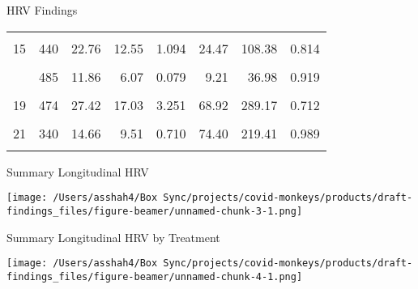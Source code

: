 \documentclass[
  ignorenonframetext,
  unknownkeysallowed]{beamer}
\begin{document}
\begin{frame}{HRV Findings}
\begin{table}[H]
\begin{tabular}{rrrrrrrr}
\cellcolor{gray!6}{14} & \cellcolor{gray!6}{339} & \cellcolor{gray!6}{9.61} & \cellcolor{gray!6}{8.77} & \cellcolor{gray!6}{0.477} & \cellcolor{gray!6}{20.89} & \cellcolor{gray!6}{39.87} & \cellcolor{gray!6}{1.079}\\
15 & 440 & 22.76 & 12.55 & 1.094 & 24.47 & 108.38 & 0.814\\
\cellcolor{gray!6}{16} & \cellcolor{gray!6}{434} & \cellcolor{gray!6}{7.94} & \cellcolor{gray!6}{6.28} & \cellcolor{gray!6}{0.285} & \cellcolor{gray!6}{4.25} & \cellcolor{gray!6}{10.21} & \cellcolor{gray!6}{0.930}\\
\addlinespace
17 & 485 & 11.86 & 6.07 & 0.079 & 9.21 & 36.98 & 0.919\\
\cellcolor{gray!6}{18} & \cellcolor{gray!6}{444} & \cellcolor{gray!6}{10.17} & \cellcolor{gray!6}{8.28} & \cellcolor{gray!6}{0.323} & \cellcolor{gray!6}{40.60} & \cellcolor{gray!6}{49.93} & \cellcolor{gray!6}{0.981}\\
19 & 474 & 27.42 & 17.03 & 3.251 & 68.92 & 289.17 & 0.712\\
\cellcolor{gray!6}{20} & \cellcolor{gray!6}{322} & \cellcolor{gray!6}{7.98} & \cellcolor{gray!6}{6.92} & \cellcolor{gray!6}{0.307} & \cellcolor{gray!6}{34.85} & \cellcolor{gray!6}{64.39} & \cellcolor{gray!6}{1.114}\\
21 & 340 & 14.66 & 9.51 & 0.710 & 74.40 & 219.41 & 0.989\\
\addlinespace
\cellcolor{gray!6}{22} & \cellcolor{gray!6}{425} & \cellcolor{gray!6}{16.02} & \cellcolor{gray!6}{11.39} & \cellcolor{gray!6}{2.084} & \cellcolor{gray!6}{31.75} & \cellcolor{gray!6}{52.75} & \cellcolor{gray!6}{0.897}\\
\bottomrule
\end{tabular}
\endgroup{}
\end{table}

\end{frame}

\begin{frame}{Summary Longitudinal HRV}
\protect\hypertarget{summary-longitudinal-hrv}{}

\texttt{[image: /Users/asshah4/Box Sync/projects/covid-monkeys/products/draft-findings\_files/figure-beamer/unnamed-chunk-3-1.png]}

\end{frame}

\begin{frame}{Summary Longitudinal HRV by Treatment}
\protect\hypertarget{summary-longitudinal-hrv-by-treatment}{}

\texttt{[image: /Users/asshah4/Box Sync/projects/covid-monkeys/products/draft-findings\_files/figure-beamer/unnamed-chunk-4-1.png]}

\end{frame}
\end{document}
